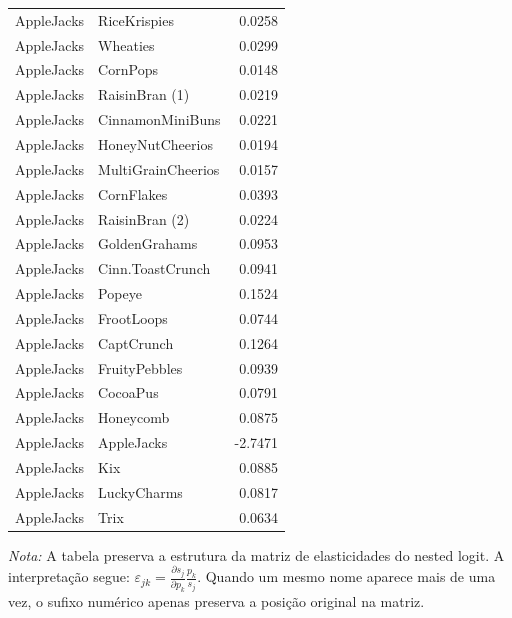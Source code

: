 \begin{table}[H]
\begin{tabular}{llr}
AppleJacks & RiceKrispies & 0.0258 \\
AppleJacks & Wheaties & 0.0299 \\
AppleJacks & CornPops & 0.0148 \\
AppleJacks & RaisinBran (1) & 0.0219 \\
AppleJacks & CinnamonMiniBuns & 0.0221 \\
AppleJacks & HoneyNutCheerios & 0.0194 \\
AppleJacks & MultiGrainCheerios & 0.0157 \\
AppleJacks & CornFlakes & 0.0393 \\
AppleJacks & RaisinBran (2) & 0.0224 \\
AppleJacks & GoldenGrahams & 0.0953 \\
AppleJacks & Cinn.ToastCrunch & 0.0941 \\
AppleJacks & Popeye & 0.1524 \\
AppleJacks & FrootLoops & 0.0744 \\
AppleJacks & CaptCrunch & 0.1264 \\
AppleJacks & FruityPebbles & 0.0939 \\
AppleJacks & CocoaPus & 0.0791 \\
AppleJacks & Honeycomb & 0.0875 \\
AppleJacks & AppleJacks & -2.7471 \\
AppleJacks & Kix & 0.0885 \\
AppleJacks & LuckyCharms & 0.0817 \\
AppleJacks & Trix & 0.0634 \\
\bottomrule
\end{tabular}

\vspace{0.3em}
\footnotesize
\textit{Nota:} A tabela preserva a estrutura da matriz de elasticidades do nested logit. A interpretação segue: $\varepsilon_{jk}=\frac{\partial s_j}{\partial p_k}\frac{p_k}{s_j}$. Quando um mesmo nome aparece mais de uma vez, o sufixo numérico apenas preserva a posição original na matriz.
\end{table}
\endgroup


